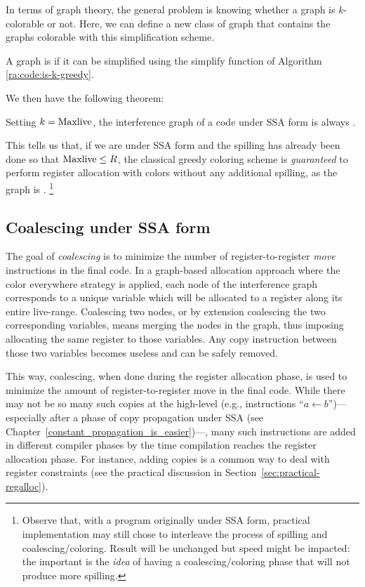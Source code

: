 {\smallskip

In terms of graph theory, the general problem is knowing whether a graph is $k$-colorable or not.
Here, we can define a new class of graph that contains the graphs colorable with this simplification scheme.
\begin{definition}
  A graph is  if it can be simplified using the simplify function of Algorithm \ref{ra:code:is-k-greedy}.
\end{definition}

\noindent
We then have the following theorem:
\begin{theorem}
Setting $k=\mathrm{Maxlive}$, the interference graph of a code under SSA form is always .
\end{theorem}

This tells us that, if we are under SSA form and the spilling has already been done so that $\mathrm{Maxlive} \leq R$, the classical greedy coloring scheme is \emph{guaranteed} to perform register allocation with \regs colors without any additional spilling, as the graph is .%
\footnote{Observe that, with a program originally under SSA form, practical implementation may still chose to interleave the process of spilling and coalescing/coloring. Result will be unchanged but speed might be impacted: the important is the \emph{idea} of having a coalescing/coloring phase that will not produce more spilling.}



\subsection{Coalescing under SSA form}
The goal of \emph{coalescing} is to minimize the number of register-to-register \emph{move} instructions in the final code.
In a graph-based allocation approach where the color everywhere strategy is applied,
each node of the interference graph corresponds to a unique variable which will be allocated to a register along its entire live-range.
%
Coalescing two nodes, or by extension coalescing the two corresponding variables, means merging the nodes in the graph, thus imposing allocating the same register to those variables.
Any copy instruction between those two variables becomes useless and can be safely removed.

This way, coalescing, when done during the register allocation phase, is used to minimize the amount of register-to-register move in the final code.
While there may not be so many such copies at the high-level (e.g., instructions ``$a \gets b$'')---especially after a phase of copy propagation under SSA (see Chapter~\ref{constant_propagation_is_easier})---, many such instructions are added in different compiler phases by the time compilation reaches the register allocation phase. 
For instance, adding copies is a common way to deal with register constraints (see the practical discussion in Section~\ref{sec:practical-regalloc}).

}
